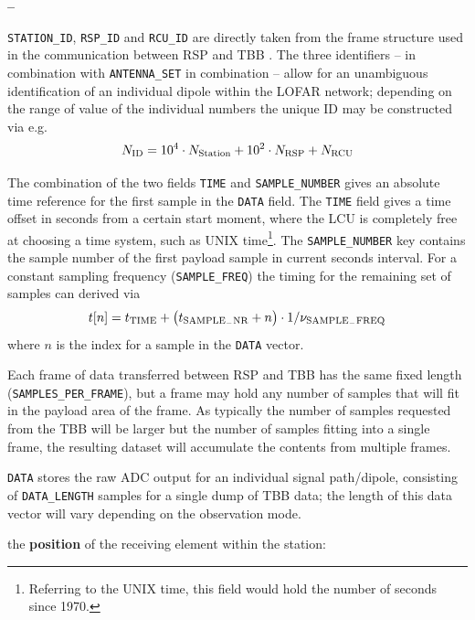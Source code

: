 \documentclass[a4paper,10pt,bibtotoc]{scrartcl}
\begin{document}
\begin{list}{\textbf{--}}{}
\item \verb|STATION_ID|, \verb|RSP_ID| and \verb|RCU_ID| are directly taken
  from the frame structure used in the communication between RSP and TBB
  \cite{poiesz.2006}. The three identifiers -- in combination with
  \verb|ANTENNA_SET| in combination -- allow for an unambiguous
  identification of an individual dipole within the LOFAR network;
  depending on the range of value of the individual numbers the unique ID
  may be constructed via e.g.
  \begin{equation}
    N_{\rm ID} = 10^4 \cdot N_{\rm Station} + 10^2 \cdot N_{\rm RSP} +
    N_{\rm RCU}
  \end{equation}
\item The combination of the two fields \verb|TIME| and
  \verb|SAMPLE_NUMBER| gives an absolute time reference for the first
  sample in the \verb|DATA| field. The \verb|TIME| field gives a time
  offset in seconds from a certain start moment, where the LCU is
  completely free at choosing a time system, such as UNIX
  time\footnote{Referring to the UNIX time, this field would hold the
    number of seconds since 1970.}.  The \verb|SAMPLE_NUMBER| key
  contains the sample number of the first payload sample in current
  seconds interval.  For a constant sampling frequency
  (\verb|SAMPLE_FREQ|) the timing for the remaining set of samples can
  derived via \cite{poiesz.2006}
  \begin{equation}
    t[n] = t_{\rm TIME} + \left( t_{\rm SAMPLE_-NR} + n  \right) \cdot
    1/\nu_{\rm SAMPLE_-FREQ}
  \end{equation}
  where $n$ is the index for a sample in the \verb|DATA| vector.
\item Each frame of data transferred between RSP and TBB has the same fixed
  length (\verb|SAMPLES_PER_FRAME|), but a frame may hold any number of samples
  that will fit in the payload area of the frame. As typically the
  number of samples requested from the TBB will be larger but the
  number of samples fitting into a single frame, the resulting dataset
  will accumulate the contents from multiple frames.
\item \verb|DATA| stores the raw ADC output for an individual signal path/dipole,
  consisting of \verb|DATA_LENGTH| samples for a single dump of TBB data; the
  length of this data vector will vary depending on the observation mode. \\
\item the \textbf{position} of the receiving element within the station:

\end{list}
\end{document}
